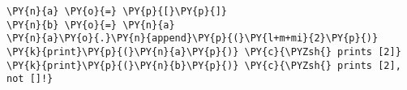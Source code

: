\begin{Verbatim}[commandchars=\\\{\}]
\PY{n}{a} \PY{o}{=} \PY{p}{[}\PY{p}{]}
\PY{n}{b} \PY{o}{=} \PY{n}{a}
\PY{n}{a}\PY{o}{.}\PY{n}{append}\PY{p}{(}\PY{l+m+mi}{2}\PY{p}{)}
\PY{k}{print}\PY{p}{(}\PY{n}{a}\PY{p}{)} \PY{c}{\PYZsh{} prints [2]}
\PY{k}{print}\PY{p}{(}\PY{n}{b}\PY{p}{)} \PY{c}{\PYZsh{} prints [2], not []!}
\end{Verbatim}
